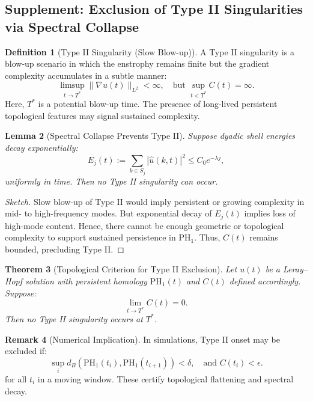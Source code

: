 \documentclass[11pt]{article}
\newtheorem{theorem}{Theorem}[section]
\newtheorem{lemma}[theorem]{Lemma}
\theoremstyle{definition}
\newtheorem{definition}[theorem]{Definition}
\newtheorem{remark}[theorem]{Remark}
\begin{document}

\subsection*{Supplement: Exclusion of Type II Singularities via Spectral Collapse}

\begin{definition}[Type II Singularity (Slow Blow-up)]
A Type II singularity is a blow-up scenario in which the enstrophy remains finite but the gradient complexity accumulates in a subtle manner:
\[
\limsup_{t \to T^*} \|\nabla u(t)\|_{L^2} < \infty, \quad \text{but } \sup_{t<T^*} C(t) = \infty.
\]
Here, $T^*$ is a potential blow-up time. The presence of long-lived persistent topological features may signal sustained complexity.
\end{definition}

\begin{lemma}[Spectral Collapse Prevents Type II]
Suppose dyadic shell energies decay exponentially:
\[
E_j(t) := \sum_{k \in S_j} |\hat{u}(k,t)|^2 \leq C_0 e^{-\lambda j},
\]
uniformly in time. Then no Type II singularity can occur.
\end{lemma}

\begin{proof}[Sketch]
Slow blow-up of Type II would imply persistent or growing complexity in mid- to high-frequency modes. But exponential decay of $E_j(t)$ implies loss of high-mode content. Hence, there cannot be enough geometric or topological complexity to support sustained persistence in $\mathrm{PH}_1$. Thus, $C(t)$ remains bounded, precluding Type II.
\end{proof}

\begin{theorem}[Topological Criterion for Type II Exclusion]
Let $u(t)$ be a Leray--Hopf solution with persistent homology $\mathrm{PH}_1(t)$ and $C(t)$ defined accordingly. Suppose:
\[
\lim_{t \to T^*} C(t) = 0.
\]
Then no Type II singularity occurs at $T^*$.
\end{theorem}

\begin{remark}[Numerical Implication]
In simulations, Type II onset may be excluded if:
\[
\sup_i d_B(\mathrm{PH}_1(t_i), \mathrm{PH}_1(t_{i+1})) < \delta, \quad \text{and } C(t_i) < \epsilon.
\]
for all $t_i$ in a moving window. These certify topological flattening and spectral decay.
\end{remark}
\end{document}
